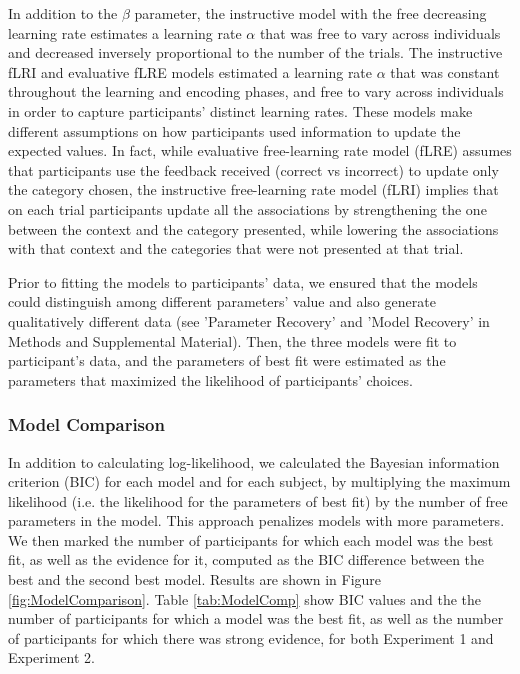 \documentclass[a4paper,12pt]{article}
\begin{document}
In addition to the $\beta$ parameter, the instructive model with the free decreasing learning rate estimates a learning rate $\alpha$ that was free to vary across individuals and decreased inversely proportional to the number of the trials. The instructive fLRI and evaluative fLRE models estimated a learning rate $\alpha$ that was constant throughout the learning and encoding phases, and free to vary across individuals in order to capture participants' distinct learning rates. These models make different assumptions on how participants used information to update the expected values. In fact, while evaluative free-learning rate model (fLRE) assumes that participants use the feedback received (correct vs incorrect) to update only the category chosen, the instructive free-learning rate model (fLRI) implies that on each trial participants update all the associations by strengthening the one between the context and the category presented, while lowering the associations with that context and the categories that were not presented at that trial.  \par
Prior to fitting the models to participants' data, we ensured that the models could distinguish among different parameters' value and also generate qualitatively different data (see 'Parameter Recovery' and 'Model Recovery' in Methods and Supplemental Material). Then, the three models were fit to participant's data, and the parameters of best fit were estimated as the parameters that maximized the likelihood of participants' choices. 

\subsubsection{Model Comparison}
In addition to calculating log-likelihood, we calculated the Bayesian information criterion (BIC) for each model and for each subject, by multiplying the maximum likelihood (i.e. the likelihood for the parameters of best fit) by the number of free parameters in the model. This approach penalizes models with more parameters. We then marked the number of participants for which each model was the best fit, as well as the evidence for it, computed as the BIC difference between the best and the second best model. Results are shown in Figure \ref{fig:ModelComparison}. Table \ref{tab:ModelComp} show BIC values and the the number of participants for which a model was the best fit, as well as the number of participants for which there was strong evidence, for both Experiment 1 and Experiment 2. 
\end{document}
